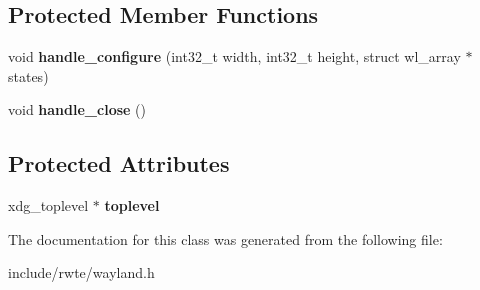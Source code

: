 \subsection*{Protected Member Functions}
\begin{DoxyCompactItemize}
\item 
\mbox{\label{classwayland_1_1XdgToplevel_a266eb51ba7b8a4a3b6c92a5be4461fbe}} 
void {\bfseries handle\+\_\+configure} (int32\+\_\+t width, int32\+\_\+t height, struct wl\+\_\+array $\ast$states)
\item 
\mbox{\label{classwayland_1_1XdgToplevel_abe3e930a6359ce94ef0a51a18e75cbc8}} 
void {\bfseries handle\+\_\+close} ()
\end{DoxyCompactItemize}
\subsection*{Protected Attributes}
\begin{DoxyCompactItemize}
\item 
\mbox{\label{classwayland_1_1XdgToplevel_adb4e6aa80ebb275e6cd6e9b4176356c7}} 
xdg\+\_\+toplevel $\ast$ {\bfseries toplevel}
\end{DoxyCompactItemize}


The documentation for this class was generated from the following file\+:\begin{DoxyCompactItemize}
\item 
include/rwte/wayland.\+h\end{DoxyCompactItemize}
